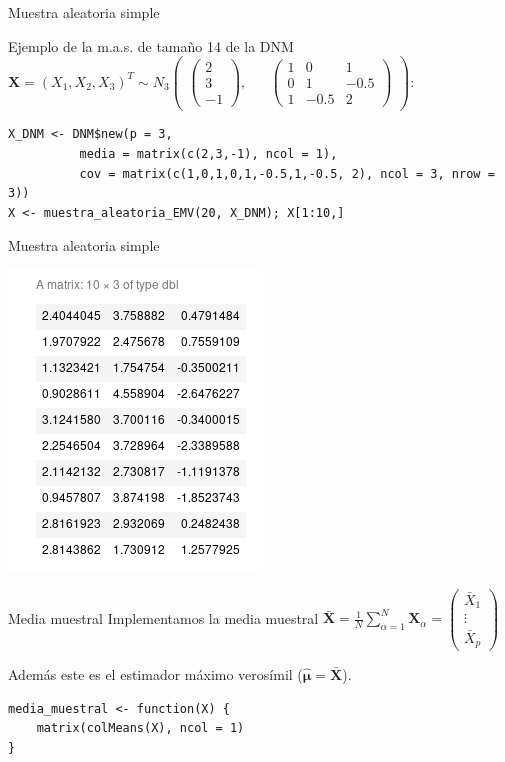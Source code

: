 \documentclass[xcolor=table]{beamer}
\begin{document}
\begin{frame}[fragile]{Muestra aleatoria simple}

Ejemplo de la m.a.s. de tamaño 14 de la DNM $\pmb{X} = (X_1, X_2, X_3)^T \sim N_3 \begin{pmatrix} \begin{pmatrix} 2 \\ 3 \\ -1 \end{pmatrix}, && \begin{pmatrix} 1 & 0 & 1 \\ 0 & 1 & -0.5 \\ 1 & -0.5 & 2 \end{pmatrix} \end{pmatrix} $:

\begin{lstlisting}
X_DNM <- DNM$new(p = 3,
          media = matrix(c(2,3,-1), ncol = 1),
          cov = matrix(c(1,0,1,0,1,-0.5,1,-0.5, 2), ncol = 3, nrow = 3))
X <- muestra_aleatoria_EMV(20, X_DNM); X[1:10,]
\end{lstlisting}

\end{frame}

\begin{frame}[fragile]{Muestra aleatoria simple}

\begin{center}
\includegraphics[scale=0.7]{mas.png}
\end{center}

\end{frame}

\begin{frame}[fragile]{Media muestral}
Implementamos la media muestral $\pmb{\bar{X}} = \frac{1}{N} \sum^N_{\alpha = 1} \pmb{X}_\alpha = \begin{pmatrix} \bar{X}_1 \\ \vdots \\ \bar{X}_p \end{pmatrix}$

Además este es el estimador máximo verosímil ($\pmb{\hat{\mu}} = \pmb{\bar{X}}$).

\begin{lstlisting}
media_muestral <- function(X) {
    matrix(colMeans(X), ncol = 1)
}
\end{lstlisting}

\end{frame}
\end{document}
